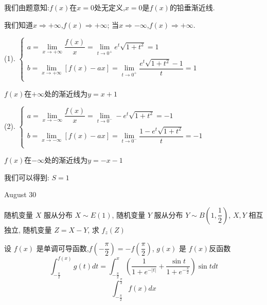 \begin{solution}

	我们由题意知:$f(x)$在$x=0$处无定义,$x=0$是$f(x)$的铅垂渐近线.
	
	我们知道$x\Rightarrow +\infty$,$f(x)\Rightarrow +\infty$; 当$x\Rightarrow -\infty$,$f(x)\Rightarrow +\infty$.
	
	(1). $\left\lbrace
	\begin{array}{l}
		a=\lim\limits_{x\to+\infty}\dfrac{f(x)}{x}=\lim\limits_{t\to 0^{+}}e^{t}\sqrt{1+t^2}=1\\
		b=\lim\limits_{x\to+\infty}\left[ f(x)-ax\right]=\lim\limits_{t\to 0^{+}}\dfrac{e^{t}\sqrt{1+t^2}-1}{t}=1\\
	\end{array}
	\right. $
	
	$f(x)$在$+\infty$处的渐近线为$y=x+1$
	
	(2). $\left\lbrace
	\begin{array}{l}
		a=\lim\limits_{x\to-\infty}\dfrac{f(x)}{x}=\lim\limits_{t\to 0^{-}}-e^{t}\sqrt{1+t^2}=-1\\
		b=\lim\limits_{x\to-\infty}\left[ f(x)-ax\right]=\lim\limits_{t\to 0^{-}}\dfrac{1-e^{t}\sqrt{1+t^2}}{t}=-1\\
	\end{array}
	\right. $
	
	$f(x)$在$-\infty$处的渐近线为$y=-x-1$
	
	我们可以得到:  $S=1$
\end{solution}


\textcolor{purplea}{August 30}

\begin{example}[][Exam: 34.4.17]
	随机变量 $X$ 服从分布 $X\sim E(1)$, 随机变量 $Y$ 服从分布 $Y\sim B(1,\dfrac{1}{2})$,
	$X,Y$ 相互独立, 随机变量 $Z=X-Y$, 求 $f_{z}(Z)$
\end{example}

\begin{solution}
	
\end{solution}

\begin{example}[][Exam: 34.4.18]
	设 $f(x)$ 是单调可导函数,$f(-\dfrac{\pi}{2})=-f(\dfrac{\pi}{2})$, $g(x)$ 是 $f(x)$反函数
	$$\int_{-\frac{\pi}{2}}^{f(x)}g(t)dt=\int_{-\frac{\pi}{2}}^{x}\left(\dfrac{1}{1+e^{-|t|}}+\dfrac{\sin t}{1+e^{-\frac{\pi}{2}}}\right)\sin tdt$$
	$$\int_{-\frac{\pi}{2}}^{\frac{\pi}{2}}f(x)dx$$
\end{example}

